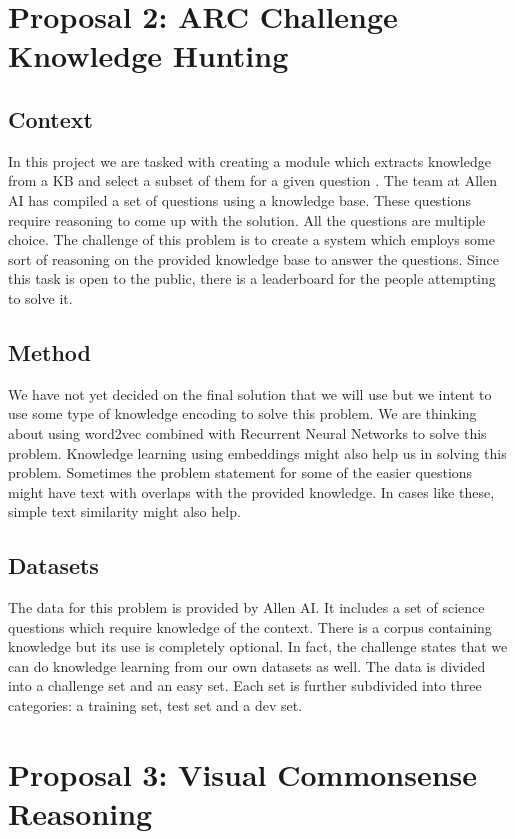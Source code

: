\documentclass[11pt,a4paper]{article}
\begin{document}
\section{Proposal 2: ARC Challenge Knowledge Hunting}
\subsection{Context}
In this project we are tasked with creating a module which extracts knowledge from a KB and select a subset of them for a given question \cite{clark2018think}.  The team at Allen AI has compiled a set of questions using a knowledge base. These questions require reasoning to come up with the solution. All the questions are multiple choice. The challenge of this problem is to create a system which employs some sort of reasoning on the provided knowledge base to answer the questions. Since this task is open to the public, there is a leaderboard for the people attempting to solve it.

\subsection{Method}
We have not yet decided on the final solution that we will use but we intent to use some type of knowledge encoding to solve this problem. We are thinking about using word2vec combined with Recurrent Neural Networks to solve this problem. Knowledge learning using embeddings might also help us in solving this problem. Sometimes the problem statement for some of the easier questions might have text with overlaps with the provided knowledge. In cases like these, simple text similarity might also help. 


\subsection{Datasets}
The data for this problem is provided by Allen AI. It includes a set of science questions which require knowledge of the context. There is a corpus containing knowledge but its use is completely optional. In fact, the challenge states that we can do knowledge learning from our own datasets as well. The data is divided into a challenge set and an easy set. Each set is further subdivided into three categories: a training set, test set and a dev set. 

\section{Proposal 3: Visual Commonsense Reasoning}
\end{document}

